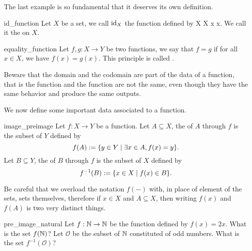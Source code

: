 The last example is so fundamental that it deserves its own definition.
\begin{cdef}{}{id_function}
    Let \( X \) be a set, we call \( \mathrm{id}_X \) the function defined by
     X X x {x.}
    We call it the  on \( X \).
\end{cdef}

\begin{cdef}{}{equality_function}
    Let \( f, g : X \to Y \) be two functions, we say that \( f = g \) if for all \( x \in X \), we have \( f(x) = g(x) \). This principle is called .
\end{cdef}
Beware that the domain and the codomain are part of the data of a function, that is the function
and the function
are not the same, even though they have the same behavior and produce the same outputs.

We now define some important data associated to a function. 
\begin{cdef}{}{image_preimage}
    Let \( f : X \to Y \) be a function. Let \( A \subseteq X \), the  of \( A \) through \( f \) is the subset of \( Y \) defined by
    \begin{equation*}
        f(A) := \{ y \in Y \mid \exists x \in A, f(x) = y \}.
    \end{equation*}
    Let \( B \subseteq Y \), the  of \( B \) through \( f \) is the subset of \( X \) defined by 
    \begin{equation*}
        f^{-1}(B) := \{ x \in X \mid f(x) \in B \}.
    \end{equation*} 
\end{cdef}

Be careful that we overload the notation \( f(-) \) with, in place of element of the sets, sets themselves, therefore if \( x \in X \) and \( A \subseteq X \), then writing \( f(x) \) and \( f(A) \) is two very distinct things.

\begin{cex}{}{pre_image_natural}
    Let \( f : \mathbb{N} \to \mathbb{N} \) be the function defined by \( f(x) = 2x \). What is the set \( f(\mathbb{N}) \)? Let \( \mathcal O \) be the subset of \( \mathbb{N} \) constituted of odd numbers. What is the set \( f^{-1}(\mathcal O) \)?    
\end{cex}

